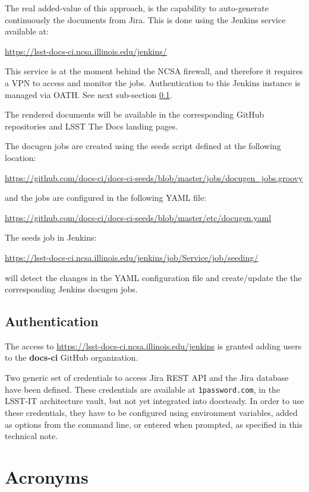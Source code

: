 \documentclass[DM]{lsstdoc}
\begin{document}
The real added-value of this approach, is the capability to auto-generate continuously the documents from Jira.
This is done using the Jenkins service available at:

\url{https://lsst-docs-ci.ncsa.illinois.edu/jenkins/}

This service is at the moment behind the NCSA firewall, and therefore it requires a VPN to access and monitor the jobs.
Authentication to this Jenkins instance is managed via OATH. See next sub-section \ref{sec:auth}.

The rendered documents will be available in the corresponding GitHub repositories and LSST The Docs landing pages.

The docugen jobs are created using the seeds script defined at the following location:

\url{https://github.com/docs-ci/docs-ci-seeds/blob/master/jobs/docugen_jobs.groovy}

and the jobs are configured in the following YAML file:

\url{https://github.com/docs-ci/docs-ci-seeds/blob/master/etc/docugen.yaml}

The seeds job in Jenkins:

\url{https://lsst-docs-ci.ncsa.illinois.edu/jenkins/job/Service/job/seeding/}

will detect the changes in the YAML configuration file and create/update the the corresponding Jenkins docugen jobs.



\subsection{Authentication}\label{sec:auth}

The access to \url{https://lsst-docs-ci.ncsa.illinois.edu/jenkins} is granted adding users to the \textbf{docs-ci} GitHub organization.

Two generic set of credentials to access Jira REST API and the Jira database have been defined.
These credentials are available at \texttt{1password.com}, in the LSST-IT architecture vault, but not yet integrated into docsteady.
In order to use these credentials, they have to be configured using environment variables, added as options from the command line, or entered when prompted, as specified in this technical note.




\appendix
\section{Acronyms} \label{sec:acronyms}
\end{document}
